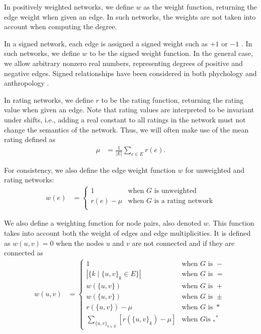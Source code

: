 \documentclass{article}
\begin{document}
In positively weighted networks, we define $w$ as the
weight function, returning the edge weight when given an edge. In such
networks, the weights are not taken into account when computing the
degree. 

In a signed network, each edge is assigned a signed weight such as $+1$
or $-1$ \citep{b647}.  In such networks, we define $w$ to be the signed weight
function.  In the general case, we allow arbitrary nonzero real numbers,
representing degrees of positive and negative edges.  Signed
relationships have been considered in both phychology \citep{b862} and
anthropology \citep{b323}.  

In rating networks, we define $r$ to be
the rating function, returning the rating value when given an edge.  Note
that rating values are interpreted to be invariant under shifts, i.e.,
adding a real constant to all ratings in the network must not
change the semantics of the network.  Thus, we will often make use of
the mean rating defined as
\begin{align}
  \mu &= \frac 1 {|E|} \sum_{e\in E} r(e). 
\end{align}

For consistency, we also
define the edge weight function $w$ for unweighted and rating networks: 
\begin{align}
  w(e) &= \left\{ \begin{array}{ll} 
    1 & \text{when $G$ is unweighted} \\
    r(e)-\mu & \text{when $G$ is a rating network} \\
  \end{array} \right. 
\end{align}

We also define a weighting function for node pairs, also denoted
$w$. This function takes into account both the weight of edges and edge
multiplicities. It is defined as $w(u,v)=0$ when the nodes $u$ and $v$ are
not connected and if they are connected as
\begin{align}
  w(u,v) &= \left\{ \begin{array}{ll}
    1 & \text{when $G$ is $-$} \\
    |\{k \mid \{u,v\}_k \in E\}| & \text{when $G$ is $=$} \\
    w(\{u,v\}) & \text{when $G$ is $+$}
    \\
    w(\{u,v\}) & \text{when $G$ is $\pm$} \\
    r(\{u,v\}) - \mu & \text{when $G$ is $*$} \\
    \sum_{\{u,v\}_{k\in E}} [r(\{u,v\}_k) - \mu] & \text{when $G$
      is $_*{}^*$}
    \end{array} \right. 
\end{align}
\end{document}
